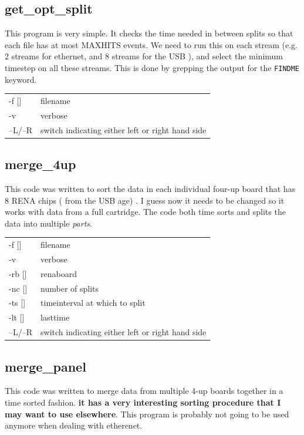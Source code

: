 \documentclass[12pt]{article}
\begin{document}
\subsection{get\_opt\_split}
This program is very simple. It checks the time needed in between splits so that each file has at most MAXHITS events. We need to run this on each stream (e.g. 2 streams for ethernet, and 8 streams for the USB ), and select the minimum timestep on all these streams. This is done by grepping the output for the {\tt FINDME} keyword. \\

\begin{tabular}{ll}
-f []& filename\\
-v & verbose\\
--L/--R & switch indicating either left or right hand side\\
\end{tabular}

\subsection{merge\_4up}
This code was written to sort the data in each individual four-up board that has 8 RENA chips ( from the USB age) . I guess now it needs to be changed so it works with data from a full cartridge. The code both time sorts and splits the data into multiple {\em parts}. \\

\begin{tabular}{ll}
-f []& filename\\
-v & verbose\\
-rb []& renaboard\\
-nc []& number of splits\\
-ts []& timeinterval at which to split\\
-lt []& lasttime \\
--L/--R & switch indicating either left or right hand side\\
\end{tabular}


\subsection{merge\_panel}
This code was written to merge data from multiple 4-up boards together in a
time sorted fashion. {\bf it has a very interesting sorting procedure that I
  may want to use elsewhere}. This program is probably not going to be used
anymore when dealing with etherenet. \\
\end{document}
